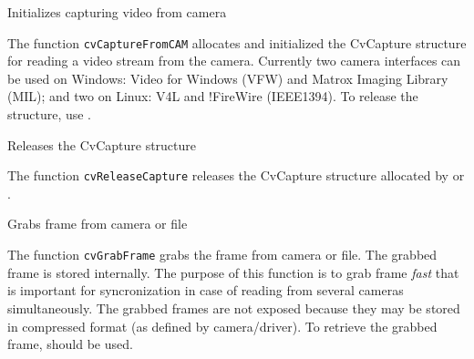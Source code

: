 
Initializes capturing video from camera


\begin{description}
\end{description}

The function \texttt{cvCaptureFromCAM} allocates and initialized the CvCapture structure for reading a video stream from the camera. Currently two camera interfaces can be used on Windows: Video for Windows (VFW) and Matrox Imaging Library (MIL); and two on Linux: V4L and !FireWire (IEEE1394).
\newline
\newline
To release the structure, use .


Releases the CvCapture structure


\begin{description}
\end{description}

The function \texttt{cvReleaseCapture} releases the CvCapture structure allocated by  or .


Grabs frame from camera or file


\begin{description}
\end{description}

The function \texttt{cvGrabFrame} grabs the frame from camera or file. The grabbed frame is stored internally. The purpose of this function is to grab frame \emph{fast} that is important for syncronization in case of reading from several cameras simultaneously. The grabbed frames are not exposed because they may be stored in compressed format (as defined by camera/driver). To retrieve the grabbed frame,  should be used.

